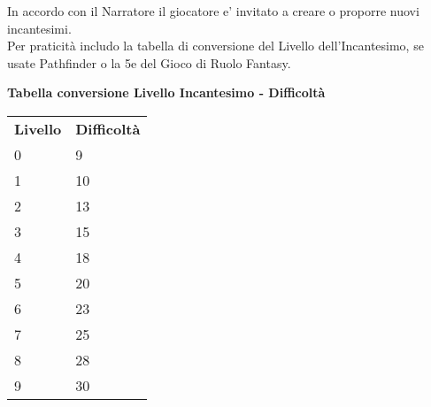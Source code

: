 In accordo con il Narratore il giocatore e' invitato a creare o proporre nuovi incantesimi.\\
Per praticità includo la tabella di conversione del Livello dell'Incantesimo, se usate Pathfinder o la 5e del Gioco di Ruolo Fantasy.\\

\medskip

\textbf{Tabella conversione Livello Incantesimo - Difficoltà}

\medskip

\begin{tabular}{ll}
\textbf{Livello} & \textbf{Difficoltà}\\
0	& 9\\
1	& 10\\
2	& 13\\
3	& 15\\
4	& 18\\
5	& 20\\
6	& 23\\
7	& 25\\
8	& 28\\
9	& 30\\
\end{tabular}